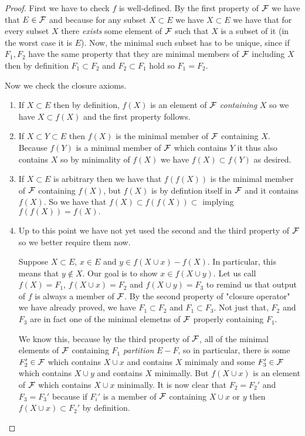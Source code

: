 \begin{proof}
    First we have to check $f$ is well-defined. By the first property of $\mathcal{F}$ we have that $E \in \mathcal{F}$ and because for any subset $X \subset E$ we have $X \subset E$ we have that for every subset $X$ there \textit{exists} some element of $\mathcal{F}$ such that $X$ is a subset of it (in the worst case it is $E$). Now, the minimal such subset has to be unique, since if $F_1, F_2$ have the same property that they are minimal members of $\mathcal{F}$ including $X$ then by definition $F_1 \subset F_2$ and $F_2 \subset F_1$ hold so $F_1 = F_2.$

    Now we check the closure axioms.

\begin{enumerate}
    \item If $X \subset E$ then by definition, $f(X)$ is an element of $\mathcal{F}$ \textit{containing} $X$ so we have $X \subset f(X)$ and the first property follows.
    
    \item If $X \subset Y \subset E$ then $f(X)$ is the minimal member of $\mathcal{F}$ containing $X$. Because $f(Y)$ is a minimal member of $\mathcal{F}$ which contains $Y$ it thus also contains $X$ so by minimality of $f(X)$ we have $f(X)\subset f(Y)$ as desired.

    \item If $X \subset E$ is arbitrary then we have that $f(f(X))$ is the minimal member of $\mathcal{F}$ containing $f(X)$, but $f(X)$ is by defintion itself in $\mathcal{F}$ and it contains $f(X)$. So we have that $f(X) \subset f(f(X)) \subset$ implying $f(f(X)) = f(X).$

    \item Up to this point we have not yet used the second and the third property of $\mathcal{F}$ so we better require them now.

     Suppose $X \subset E$, $x \in E$ and $y \in f(X \cup x) - f(X)$. In particular, this means that $y \notin X$.
   Our goal is to show $x \in f(X \cup y)$. Let us call $f(X) = F_1$, $f(X \cup x) = F_2$ and $f(X \cup y) = F_3$ to remind us that output of $f$ is always a member of $\mathcal{F}$. By the second property of "closure operator" we have already proved, we have $F_1 \subset F_2$ and $F_1 \subset F_3$. Not just that, $F_2$ and $F_3$ are in fact one of the minimal elemetns of $\mathcal{F}$ properly containing $F_1$.

     We know this, because by the third property of $\mathcal{F}$, all of the minimal elements of $\mathcal{F}$ containing $F_1$ \textit{partition} $E-F$, so in particular, there is some $F_2' \in \mathcal{F}$ which contains $X\cup x$ and contains $X$ minimaly and some $F_3' \in \mathcal{F}$ which contains $X \cup y$ and contains $X$ minimally. But $f(X \cup x)$ is an element of $\mathcal{F}$ which contains $X \cup x$ minimally. It is now clear that $F_2= F_2'$ and $F_3 = F_3'$ because if $F_i'$ is a member of $\mathcal{F}$ containing $X \cup x$ or $y$ then $f(X\cup x) \subset F_2'$ by definition.



\end{enumerate}
\end{proof}
